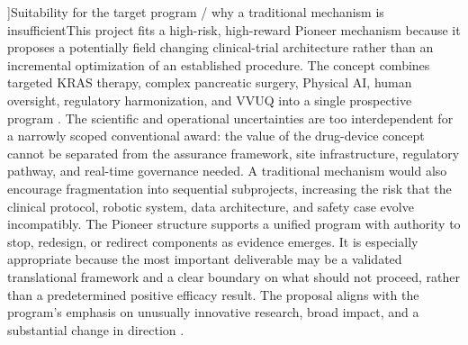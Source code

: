 {]{Suitability for the target program / why a traditional mechanism is insufficient}{This project fits a high-risk, high-reward Pioneer mechanism because it proposes a potentially field changing clinical-trial architecture rather than an incremental optimization of an established procedure. The concept combines targeted KRAS therapy, complex pancreatic surgery, Physical AI, human ^^Joversight, regulatory harmonization, and VVUQ into a single prospective program \citep{phase1ind,onpremwhippl,clintrustpai}. The scientific and operational uncertainties are too interdependent ^^Jfor a narrowly scoped conventional award: the value of the drug-device concept cannot be separated from the assurance framework, site infrastructure, regulatory pathway, and real-time governance needed. ^^J ^^JA traditional mechanism would also encourage fragmentation into sequential subprojects, increasing the risk that the clinical protocol, robotic system, data architecture, and safety case evolve incompatibly. The Pioneer structure supports a unified program with authority to stop, redesign, or redirect components as evidence emerges. It is especially appropriate because the most important deliverable may be a ^^Jvalidated translational framework and a clear boundary on what should not proceed, rather than a predetermined positive efficacy result. The proposal aligns with the program's emphasis on unusually innovative research, broad impact, and a substantial change in direction \citep{nih_rfa_rm_27_001}.
}
}

